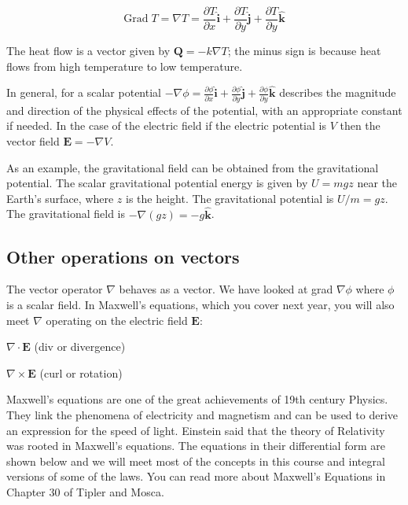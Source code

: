 \documentclass[
  letterpaper,
  DIV=11,
  numbers=noendperiod]{scrreprt}
\begin{document}
\begin{equation}
 \text{Grad} \; T = \nabla T = \frac{\partial T} {\partial x} \hat{\mathbf{i}} + \frac{\partial T}{\partial y} \hat{\mathbf{j}} + \frac{\partial T}{\partial y} \hat{\mathbf{k}}
\end{equation}

The heat flow is a vector given by \(\mathbf{Q} = -k \nabla T\); the
minus sign is because heat flows from high temperature to low
temperature.

In general, for a scalar potential
\(-\nabla \phi = \frac{\partial \phi} {\partial x} \hat{\mathbf{i}} + \frac{\partial \phi}{\partial y} \hat{\mathbf{j}} + \frac{\partial \phi}{\partial y} \hat{\mathbf{k}}\)
describes the magnitude and direction of the physical effects of the
potential, with an appropriate constant if needed. In the case of the
electric field if the electric potential is \(V\) then the vector field
\(\mathbf{E} = -\nabla V\).

As an example, the gravitational field can be obtained from the
gravitational potential. The scalar gravitational potential energy is
given by \(U = mgz\) near the Earth's surface, where \(z\) is the
height. The gravitational potential is \(U/m = gz\). The gravitational
field is \(-\nabla(gz)=-g \hat{\mathbf{k}}\).

\subsection{Other operations on
vectors}\label{other-operations-on-vectors}

The vector operator \(\nabla\) behaves as a vector. We have looked at
grad \(\nabla\phi\) where \(\phi\) is a scalar field. In Maxwell's
equations, which you cover next year, you will also meet \(\nabla\)
operating on the electric field \(\mathbf{E}\):

\(\nabla \cdot \mathbf{E}\) (div or divergence)

\(\nabla \times \mathbf{E}\) (curl or rotation)

Maxwell's equations are one of the great achievements of 19th century
Physics. They link the phenomena of electricity and magnetism and can be
used to derive an expression for the speed of light. Einstein said that
the theory of Relativity was rooted in Maxwell's equations. The
equations in their differential form are shown below and we will meet
most of the concepts in this course and integral versions of some of the
laws. You can read more about Maxwell's Equations in Chapter 30 of
Tipler and Mosca.
\end{document}
